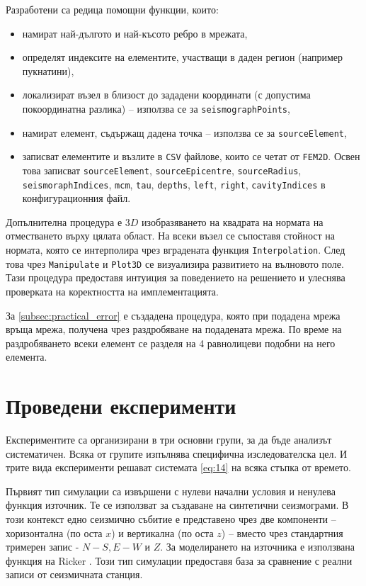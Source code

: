 \documentclass{report}
\begin{document}
	Разработени са редица помощни функции, които:
	\begin{itemize}
		\item намират най-дългото и най-късото ребро в мрежата,
		\item определят индексите на елементите, участващи в даден регион (например пукнатини),
		\item локализират възел в близост до зададени координати (с допустима покоординатна разлика) – използва се за \texttt{seismographPoints},
		\item намират елемент, съдържащ дадена точка – използва се за \texttt{sourceElement},
		\item записват елементите и възлите в \texttt{CSV} файлове, които се четат от \texttt{FEM2D}. Освен това записват \texttt{sourceElement}, \texttt{sourceEpicentre}, \texttt{sourceRadius}, \texttt{seismoraphIndices}, \texttt{mcm}, \texttt{tau}, \texttt{depths}, \texttt{left}, \texttt{right}, \texttt{cavityIndices} в конфигурационния файл.
	\end{itemize}
	
	Допълнителна процедура е $3D$ изобразяването на квадрата на нормата на отместването върху цялата област. На всеки възел се съпоставя стойност на нормата, която се интерполира чрез вградената функция \texttt{Interpolation}. След това чрез \texttt{Manipulate} и \texttt{Plot3D} се визуализира развитието на вълновото поле. Тази процедура предоставя интуиция за поведението на решението и улеснява проверката на коректността на имплементацията.
	
	За \ref{subsec:practical_error} е създадена процедура, която при подадена мрежа връща мрежа, получена чрез раздробяване на подадената мрежа. По време на раздробяването всеки елемент се разделя на 4 равнолицеви подобни на него елемента.
	
	\section{Проведени експерименти}
     Експериментите са организирани в три основни групи, за да бъде анализът систематичен. Всяка от групите изпълнява специфична изследователска цел. И трите вида експерименти решават системата \ref{eq:14} на всяка стъпка от времето.
	
	Първият тип симулации са извършени с нулеви начални условия и ненулева функция източник. Те се използват за създаване на синтетични сеизмограми. В този контекст едно сеизмично събитие е представено чрез две компоненти – хоризонтална (по оста $x$) и вертикална (по оста $z$) – вместо чрез стандартния тримерен запис - $N-S,E-W$ и $Z$. За моделирането на източника е използвана функция на Ricker \cite{wang2015frequencies}. Този тип симулации предоставя база за сравнение с реални записи от сеизмичната станция.
	
\end{document}
